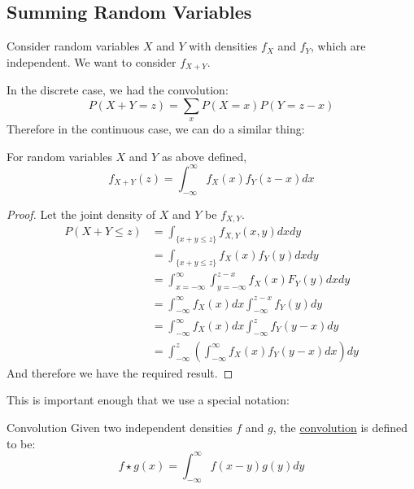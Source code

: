 \documentclass[../Main.tex]{subfiles}
\begin{document}
\subsection{Summing Random Variables}
Consider random variables $X$ and $Y$ with densities $f_X$ and $f_Y$, which are independent. We want to consider $f_{X + Y}$.\par
In the discrete case, we had the convolution:
\begin{equation*}
    P(X + Y = z) = \sum_x P(X = x)P(Y = z - x)
\end{equation*}
Therefore in the continuous case, we can do a similar thing:
\begin{proposition}
    For random variables $X$ and $Y$ as above defined,
    \begin{equation*}
        f_{X + Y}(z) = \int_{-\infty}^\infty f_X(x) f_Y(z - x) dx
    \end{equation*}
    \label{propSumContRVs}
\end{proposition}
\begin{proof}
    Let the joint density of $X$ and $Y$ be $f_{X, Y}$.
    \begin{align*}
        P(X + Y \leq z) &= \int_{\{x + y \leq z\}} f_{X, Y} (x, y) dx dy \\
        &= \int_{\{x + y \leq z\}} f_X(x) f_Y(y) dx dy \\
        &= \int_{x = -\infty}^\infty \int_{y = -\infty}^{z - x} f_X(x) F_Y(y) dx dy \\
        &= \int_{-\infty}^\infty f_X(x) dx \int_{-\infty}^{z - x} f_Y(y) dy \\
        &= \int_{-\infty}^\infty f_X(x) dx \int_{-\infty}^z f_Y(y - x) dy \\
        &= \int_{-\infty}^z \left(\int_{-\infty}^\infty f_X(x) f_Y(y-x)dx\right)dy
    \end{align*}
    And therefore we have the required result.
\end{proof}
This is important enough that we use a special notation:
\begin{definition}{Convolution}
    Given two independent densities $f$ and $g$, the \underline{convolution} is defined to be:
    \begin{equation}
        f \star g(x) = \int_{-\infty}^\infty f(x - y) g(y) dy
        \label{eqnContConvolution}
    \end{equation}
\end{definition}
\end{document}
